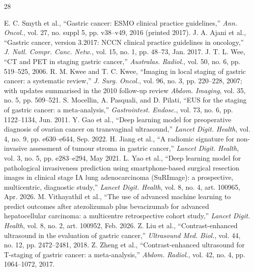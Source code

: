 \documentclass[11pt,a4paper]{article}
\begin{document}

\begin{thebibliography}{28}

 E. C. Smyth et al., ``Gastric cancer: ESMO clinical practice guidelines,'' \emph{Ann. Oncol.}, vol. 27, no. suppl 5, pp. v38--v49, 2016 (printed 2017).
 J. A. Ajani et al., ``Gastric cancer, version 3.2017: NCCN clinical practice guidelines in oncology,'' \emph{J. Natl. Compr. Canc. Netw.}, vol. 15, no. 1, pp. 48--73, Jan. 2017.
 J. T. L. Wee, ``CT and PET in staging gastric cancer,'' \emph{Australas. Radiol.}, vol. 50, no. 6, pp. 519--525, 2006.
 R. M. Kwee and T. C. Kwee, ``Imaging in local staging of gastric cancer: a systematic review,'' \emph{J. Surg. Oncol.}, vol. 96, no. 3, pp. 220--228, 2007; with updates summarised in the 2010 follow-up review \emph{Abdom. Imaging}, vol. 35, no. 5, pp. 509--521.
 S. Mocellin, A. Pasquali, and D. Pilati, ``EUS for the staging of gastric cancer: a meta-analysis,'' \emph{Gastrointest. Endosc.}, vol. 73, no. 6, pp. 1122--1134, Jun. 2011.
 Y. Gao et al., ``Deep learning model for preoperative diagnosis of ovarian cancer on transvaginal ultrasound,'' \emph{Lancet Digit. Health}, vol. 4, no. 9, pp. e630--e644, Sep. 2022.
 H. Jiang et al., ``A radiomic signature for non-invasive assessment of tumour stroma in gastric cancer,'' \emph{Lancet Digit. Health}, vol. 3, no. 5, pp. e283--e294, May 2021.
 L. Yao et al., ``Deep learning model for pathological invasiveness prediction using smartphone-based surgical resection images in clinical stage IA lung adenocarcinoma (SuRImage): a prospective, multicentric, diagnostic study,'' \emph{Lancet Digit. Health}, vol. 8, no. 4, art. 100965, Apr. 2026.
 M. Vithayathil et al., ``The use of advanced machine learning to predict outcomes after atezolizumab plus bevacizumab for advanced hepatocellular carcinoma: a multicentre retrospective cohort study,'' \emph{Lancet Digit. Health}, vol. 8, no. 2, art. 100952, Feb. 2026.
 Z. Liu et al., ``Contrast-enhanced ultrasound in the evaluation of gastric cancer,'' \emph{Ultrasound Med. Biol.}, vol. 44, no. 12, pp. 2472--2481, 2018.
 Z. Zheng et al., ``Contrast-enhanced ultrasound for T-staging of gastric cancer: a meta-analysis,'' \emph{Abdom. Radiol.}, vol. 42, no. 4, pp. 1064--1072, 2017.

\end{thebibliography}
\end{document}
